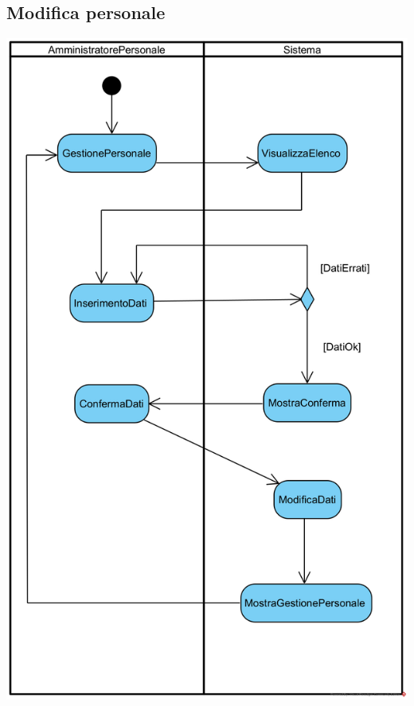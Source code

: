 \documentclass[12pt,a4paper]{article}
\begin{document}
\subsection{Modifica personale}
\begin{center}
\includegraphics[width=\textwidth]{ActivityDiagram/AmministratorePersonaleModificaDipendente}
\end{center}
\end{document}
